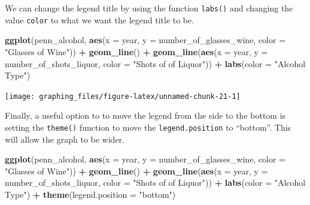 \documentclass[
  12pt,
]{book}
\newenvironment{Shaded}{\begin{snugshade}}{\end{snugshade}}
\newcommand{\DataTypeTok}[1]{\textcolor[rgb]{0.13,0.29,0.53}{#1}}
\newcommand{\KeywordTok}[1]{\textcolor[rgb]{0.13,0.29,0.53}{\textbf{#1}}}
\newcommand{\NormalTok}[1]{#1}
\newcommand{\OperatorTok}[1]{\textcolor[rgb]{0.81,0.36,0.00}{\textbf{#1}}}
\newcommand{\StringTok}[1]{\textcolor[rgb]{0.31,0.60,0.02}{#1}}
\begin{document}
We can change the legend title by using the function \texttt{labs()} and changing the value \texttt{color} to what we want the legend title to be.

\begin{Shaded}
\begin{Highlighting}[]
\KeywordTok{ggplot}\NormalTok{(penn\_alcohol, }\KeywordTok{aes}\NormalTok{(}\DataTypeTok{x =}\NormalTok{ year, }\DataTypeTok{y =}\NormalTok{ number\_of\_glasses\_wine,}
                         \DataTypeTok{color =} \StringTok{"Glasses of Wine"}\NormalTok{)) }\OperatorTok{+}
\StringTok{  }\KeywordTok{geom\_line}\NormalTok{() }\OperatorTok{+}
\StringTok{  }\KeywordTok{geom\_line}\NormalTok{(}\KeywordTok{aes}\NormalTok{(}\DataTypeTok{x =}\NormalTok{ year, }\DataTypeTok{y =}\NormalTok{ number\_of\_shots\_liquor,}
                \DataTypeTok{color =} \StringTok{"Shots of of Liquor"}\NormalTok{)) }\OperatorTok{+}
\StringTok{  }\KeywordTok{labs}\NormalTok{(}\DataTypeTok{color =} \StringTok{"Alcohol Type"}\NormalTok{)}
\end{Highlighting}
\end{Shaded}

\begin{center}\texttt{[image: graphing\_files/figure-latex/unnamed-chunk-21-1]} \end{center}

Finally, a useful option to to move the legend from the side to the bottom is setting the \texttt{theme()} function to move the \texttt{legend.position} to ``bottom''. This will allow the graph to be wider.

\begin{Shaded}
\begin{Highlighting}[]
\KeywordTok{ggplot}\NormalTok{(penn\_alcohol, }\KeywordTok{aes}\NormalTok{(}\DataTypeTok{x =}\NormalTok{ year, }\DataTypeTok{y =}\NormalTok{ number\_of\_glasses\_wine,}
                         \DataTypeTok{color =} \StringTok{"Glasses of Wine"}\NormalTok{)) }\OperatorTok{+}
\StringTok{  }\KeywordTok{geom\_line}\NormalTok{() }\OperatorTok{+}
\StringTok{  }\KeywordTok{geom\_line}\NormalTok{(}\KeywordTok{aes}\NormalTok{(}\DataTypeTok{x =}\NormalTok{ year, }\DataTypeTok{y =}\NormalTok{ number\_of\_shots\_liquor,}
                \DataTypeTok{color =} \StringTok{"Shots of of Liquor"}\NormalTok{)) }\OperatorTok{+}
\StringTok{  }\KeywordTok{labs}\NormalTok{(}\DataTypeTok{color =} \StringTok{"Alcohol Type"}\NormalTok{) }\OperatorTok{+}
\StringTok{  }\KeywordTok{theme}\NormalTok{(}\DataTypeTok{legend.position =} \StringTok{"bottom"}\NormalTok{)}
\end{Highlighting}
\end{Shaded}
\end{document}

